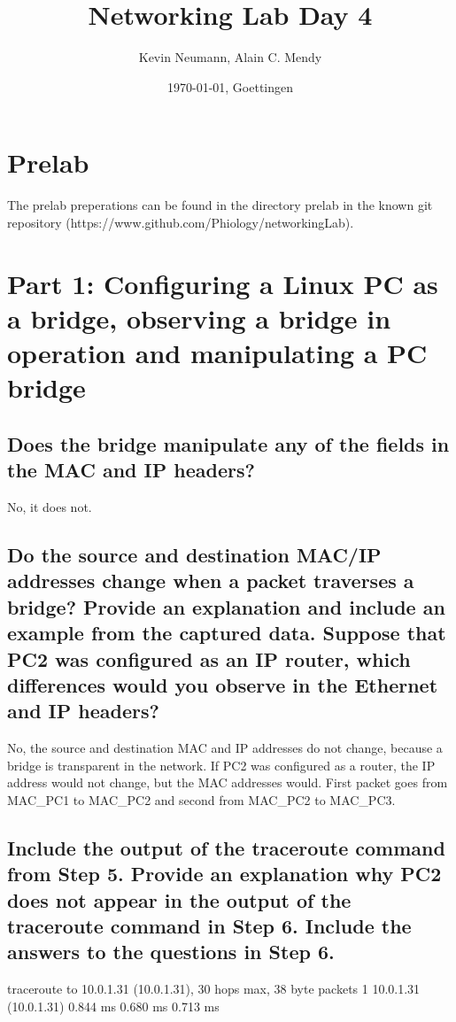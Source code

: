 \documentclass[a4paper, 11pt]{article}
\title{Networking Lab Day 4}
\author{Kevin Neumann, Alain C. Mendy}
\date{\today{}, Goettingen}
\begin{document}
\maketitle
\newpage
\tableofcontents
\newpage
\section{Prelab}

The prelab preperations can be found in the directory prelab in the known git repository (https://www.github.com/Phiology/networkingLab).

\section{Part 1: Configuring a Linux PC as a bridge, observing a bridge in operation and manipulating a PC bridge }

\subsection{Does the bridge manipulate any of the fields in the MAC and IP headers? }

No, it does not.

\subsection{Do the source and destination MAC/IP addresses change when a packet traverses a bridge? Provide an explanation and include an example from the captured data. Suppose that PC2 was configured as an IP router, which differences would you observe in the Ethernet and IP headers? }

No, the source and destination MAC and IP addresses do not change, because a bridge is transparent in the network. If PC2 was configured as a router, the IP address would not change, but the MAC addresses would. First packet goes from MAC_PC1 to MAC_PC2 and second from MAC_PC2 to MAC_PC3.

\subsection{Include the output of the traceroute command from Step 5. Provide an explanation why PC2 does not appear in the output of the traceroute command in Step 6. Include the answers to the questions in Step 6.  }

traceroute to 10.0.1.31 (10.0.1.31), 30 hops max, 38 byte packets
1  10.0.1.31 (10.0.1.31)  0.844 ms  0.680 ms  0.713 ms
\end{document}
